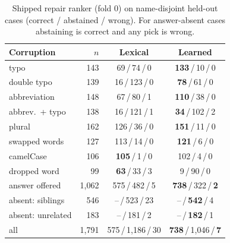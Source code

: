 \documentclass[conference]{IEEEtran}
\begin{document}
\begin{table}[t]
\centering
\caption{Shipped repair ranker (fold 0) on name-disjoint held-out cases (correct / abstained /
wrong). For answer-absent cases abstaining is correct and any pick is wrong.}
\label{tab:assistheld}
\footnotesize
\setlength{\tabcolsep}{4pt}
\begin{tabular}{@{}lrcc@{}}
\toprule
Corruption & $n$ & Lexical & Learned\\
\midrule
typo              & 143 &  69\,/\,74\,/\,0  & \textbf{133}\,/\,10\,/\,0\\
double typo       & 139 &  16\,/\,123\,/\,0 & \textbf{78}\,/\,61\,/\,0\\
abbreviation      & 148 &  67\,/\,80\,/\,1  & \textbf{110}\,/\,38\,/\,0\\
abbrev.\ + typo   & 138 &  16\,/\,121\,/\,1 & \textbf{34}\,/\,102\,/\,2\\
plural            & 162 & 126\,/\,36\,/\,0  & \textbf{151}\,/\,11\,/\,0\\
swapped words     & 127 & 113\,/\,14\,/\,0  & \textbf{121}\,/\,6\,/\,0\\
camelCase         & 106 & \textbf{105}\,/\,1\,/\,0 & 102\,/\,4\,/\,0\\
dropped word      &  99 & \textbf{63}\,/\,33\,/\,3 & 9\,/\,90\,/\,0\\
\midrule
answer offered    & 1{,}062 & 575\,/\,482\,/\,5 & \textbf{738}\,/\,322\,/\,\textbf{2}\\
absent: siblings  &   546 & --\,/\,523\,/\,23 & --\,/\,\textbf{542}\,/\,4\\
absent: unrelated &   183 & --\,/\,181\,/\,2  & --\,/\,\textbf{182}\,/\,1\\
\midrule
all               & 1{,}791 & 575\,/\,1{,}186\,/\,30 & \textbf{738}\,/\,1{,}046\,/\,\textbf{7}\\
\bottomrule
\end{tabular}
\end{table}
\end{document}
